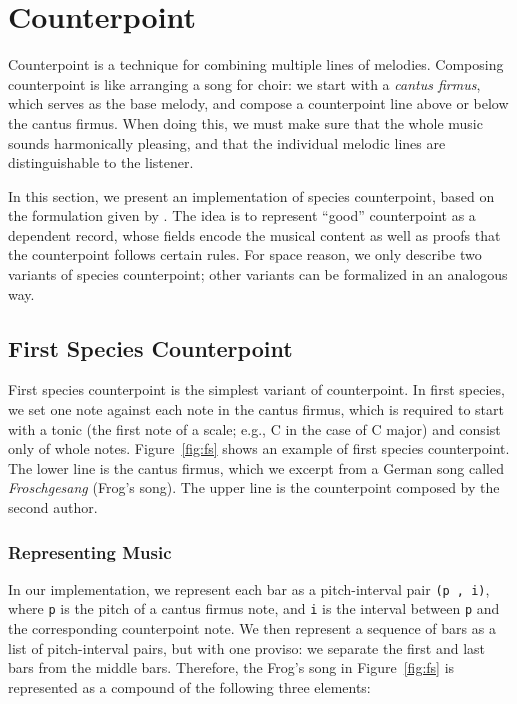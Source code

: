 \section{Counterpoint}
\label{sec:cp}

Counterpoint is a technique for combining multiple lines of melodies.
Composing counterpoint is like arranging a song for choir:
we start with a \emph{cantus firmus}, which serves as the base melody,
and compose a counterpoint line above or below the cantus firmus.
When doing this, we must make sure that the whole music sounds
harmonically pleasing, and that the individual melodic lines are
distinguishable to the listener.

In this section, we present an implementation of species counterpoint,
based on the formulation given by \citet{fux-cp}.
The idea is to represent ``good'' counterpoint  as a dependent record,
whose fields encode the musical content as well as proofs that the
counterpoint follows certain rules.
For space reason, we only describe two variants of species counterpoint;
other variants can be formalized in an analogous way.

\subsection{First Species Counterpoint}
\label{sec:cp:fs}

\FS

First species counterpoint is the simplest variant of counterpoint.
In first species, we set one note against each note in the cantus firmus,
which is required to start with a tonic (the first note of a scale;
e.g., C in the case of C major) and consist only of whole notes.
Figure~\ref{fig:fs} shows an example of first species counterpoint.
The lower line is the cantus firmus, which we excerpt from a German
song called \emph{Froschgesang} (Frog's song).
The upper line is the counterpoint composed by the second author.

\subsubsection{Representing Music}

In our implementation, we represent each bar as a pitch-interval pair
\texttt{(p ,  i)}, where \texttt{p} is the pitch of a cantus firmus note,
and \texttt{i} is the interval between \texttt{p} and the corresponding
counterpoint note.
We then represent a sequence of bars as a list of pitch-interval pairs,
but with one proviso: we separate the first and last bars from the
middle bars.
Therefore, the Frog's song in Figure~\ref{fig:fs} is represented as a
compound of the following three elements:

